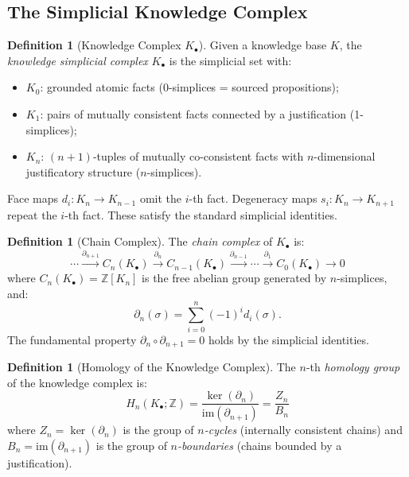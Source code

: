 \documentclass[11pt,a4paper]{article}
\theoremstyle{plain}
\theoremstyle{definition}
\newtheorem{definition}[theorem]{Definition}
\theoremstyle{remark}
\newcommand{\im}{\mathrm{im}}
\newcommand{\Z}{\mathbb{Z}}
\begin{document}
\subsection{The Simplicial Knowledge Complex}

\begin{definition}[Knowledge Complex $K_\bullet$]
\label{def:knowledge-complex}
Given a knowledge base $K$, the \emph{knowledge simplicial complex} $K_\bullet$ is the simplicial set with:
\begin{itemize}[nosep]
  \item $K_0$: grounded atomic facts (0-simplices = sourced propositions);
  \item $K_1$: pairs of mutually consistent facts connected by a justification (1-simplices);
  \item $K_n$: $(n+1)$-tuples of mutually co-consistent facts with $n$-dimensional justificatory structure ($n$-simplices).
\end{itemize}
Face maps $d_i: K_n \to K_{n-1}$ omit the $i$-th fact. Degeneracy maps $s_i: K_n \to K_{n+1}$ repeat the $i$-th fact. These satisfy the standard simplicial identities.
\end{definition}

\begin{definition}[Chain Complex]
\label{def:chain-complex}
The \emph{chain complex} of $K_\bullet$ is:
\[
\cdots \xrightarrow{\partial_{n+1}} C_n(K_\bullet) \xrightarrow{\partial_n} C_{n-1}(K_\bullet) \xrightarrow{\partial_{n-1}} \cdots \xrightarrow{\partial_1} C_0(K_\bullet) \to 0
\]
where $C_n(K_\bullet) = \Z[K_n]$ is the free abelian group generated by $n$-simplices, and:
\begin{equation}
\label{eq:boundary}
\partial_n(\sigma) = \sum_{i=0}^{n} (-1)^i d_i(\sigma).
\end{equation}
The fundamental property $\partial_n \circ \partial_{n+1} = 0$ holds by the simplicial identities.
\end{definition}

\begin{definition}[Homology of the Knowledge Complex]
\label{def:homology}
The $n$-th \emph{homology group} of the knowledge complex is:
\begin{equation}
\label{eq:homology}
H_n(K_\bullet; \Z) = \frac{\ker(\partial_n)}{\im(\partial_{n+1})} = \frac{Z_n}{B_n}
\end{equation}
where $Z_n = \ker(\partial_n)$ is the group of \emph{$n$-cycles} (internally consistent chains) and $B_n = \im(\partial_{n+1})$ is the group of \emph{$n$-boundaries} (chains bounded by a justification).
\end{definition}
\end{document}
